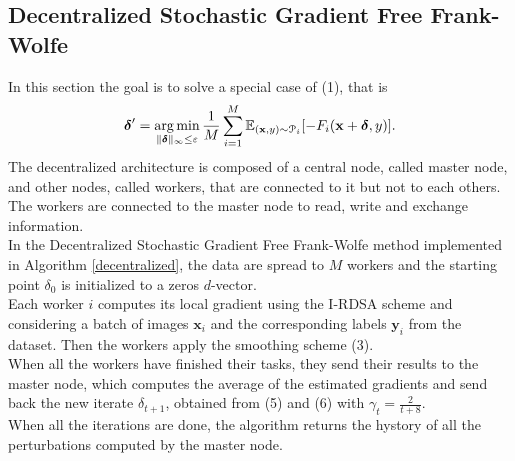 \subsection{Decentralized Stochastic Gradient Free Frank-Wolfe}
In this section the goal is to solve a special case of (1), that is
\begin{equation}
	\mbox{\boldmath$ \delta$}' = \operatorname*{arg\,min}_{\lVert \mbox{\boldmath$\scriptstyle \delta$}\rVert_{\infty}\leq\varepsilon} \frac{1}{M}\sum_{i=1}^M \mathbb{E}_{(\mathbf{x},y)\sim \mathcal{P}_i}[- F_i(\mathbf{x}+\mbox{\boldmath$ \delta$},y)].
\end{equation}
The decentralized architecture is composed of a central node, called master node, and other nodes, called workers, that are connected to it but not to each others.
The workers are connected to the master node to read, write and exchange information.\\
\indent In the Decentralized Stochastic Gradient Free Frank-Wolfe method implemented in Algorithm \ref{decentralized}, the data are spread to $M$ workers and the starting point \mbox{\boldmath$ \delta$}$_{0}$ is initialized to a zeros $d$-vector.\\
\indent Each worker $i$ computes its local gradient using the I-RDSA scheme and considering a batch of images $\mathbf{x}_i$ and the corresponding labels $\mathbf{y}_i$ from the dataset. Then the workers apply the smoothing scheme (3).\\
\indent When all the workers have finished their tasks, they send their results to the master node, which computes the average of the estimated gradients and send back the new iterate \mbox{\boldmath$ \delta$}$_{t+1}$, obtained from (5) and (6) with $\gamma_t = \frac{2}{t+8}$.\\
\indent When all the iterations are done, the algorithm returns the hystory of all the perturbations computed by the master node.

